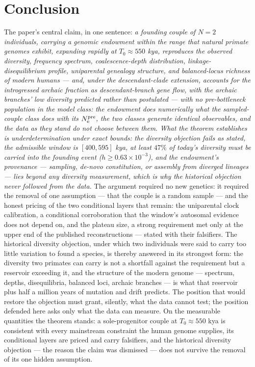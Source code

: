 \section{Conclusion}\label{sec:conclusion}
The paper's central claim, in one sentence: \emph{a founding couple of
$N=2$ individuals, carrying a genomic endowment within the range that
natural primate genomes exhibit, expanding rapidly at $T_0 \approx 550$
kya, reproduces the observed diversity, frequency spectrum,
coalescence-depth distribution, linkage-disequilibrium profile,
uniparental genealogy structure, and balanced-locus richness of modern
humans --- and, under the descendant-clade extension, accounts for the
introgressed archaic fraction as descendant-branch gene flow, with the
archaic branches' low diversity predicted rather than postulated --- with
no pre-bottleneck population in the model class: the endowment does
numerically what the sampled-couple class does with its $N_{\mathrm{e}}^{\mathrm{pre}}$, the two
classes generate identical observables, and the data as they stand do not
choose between them. What the theorem establishes is underdetermination
under exact bounds: the diversity objection fails as stated, the
admissible window is $[400, 595]$ kya, at least $47\%$ of today's
diversity must be carried into the founding event ($h \ge
0.63\times10^{-3}$), and the endowment's provenance --- sampling, de-novo
constitution, or assembly from diverged lineages --- lies beyond any
diversity measurement, which is why the historical objection never
followed from the data.} The
argument required no new genetics: it required the removal of one
assumption --- that the couple is a random sample --- and the honest
pricing of the two conditional layers that remain: the uniparental clock
calibration, a conditional corroboration that the window's autosomal
evidence does not depend on, and the plateau size, a strong requirement
met only at the upper end of the published reconstructions --- stated
with their falsifiers. The
historical diversity objection, under which two individuals were said to
carry too little variation to found a species, is thereby answered in its
strongest form: the diversity two primates can carry is not a shortfall
against the requirement but a reservoir exceeding it, and the structure
of the modern genome --- spectrum, depths, disequilibria, balanced loci,
archaic branches --- is what that reservoir plus half a million years of
mutation and drift predicts. The position that would restore the
objection must grant, silently, what the data cannot test; the position
defended here asks only what the data can measure. On the measurable
quantities the theorem stands: a sole-progenitor couple at
$T_0 \approx 550$ kya is consistent with every mainstream constraint the
human genome supplies, its conditional layers are priced and carry
falsifiers, and the historical diversity objection --- the reason the
claim was dismissed --- does not survive the removal of its one hidden
assumption.

